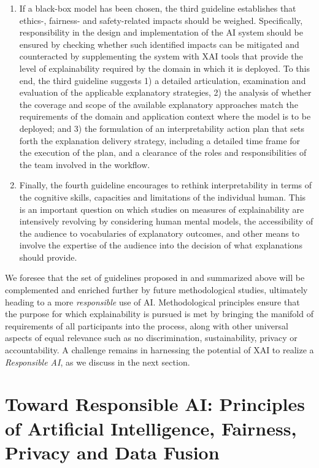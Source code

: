 \documentclass[final]{elsarticle}
\begin{document}
{\begin{enumerate}[leftmargin=*]
\item If a black-box model has been chosen, the third guideline establishes that ethics-, fairness- and safety-related impacts should be weighed. Specifically, responsibility in the design and implementation of the AI system should be ensured by checking whether such identified impacts can be mitigated and counteracted by supplementing the system with XAI tools that provide the level of explainability required by the domain in which it is deployed. To this end, the third guideline suggests 1) a detailed articulation, examination and evaluation of the applicable explanatory strategies, 2) the analysis of whether the coverage and scope of the available explanatory approaches match the requirements of the domain and application context where the model is to be deployed; and 3) the formulation of an interpretability action plan that sets forth the explanation delivery strategy, including a detailed time frame for the execution of the plan, and a clearance of the roles and responsibilities of the team involved in the workflow. 

\item Finally, the fourth guideline encourages to rethink interpretability in terms of the cognitive skills, capacities and limitations of the individual human. This is an important question on which studies on measures of explainability are intensively revolving by considering human mental models, the accessibility of the audience to vocabularies of explanatory outcomes, and other means to involve the expertise of the audience into the decision of what explanations should provide.
\end{enumerate}

We foresee that the set of guidelines proposed in \cite{1906.05684} and summarized above will be complemented and enriched further by future methodological studies, ultimately heading to a more \emph{responsible} use of AI. Methodological principles ensure that the purpose for which explainability is pursued is met by bringing the manifold of requirements of all participants into the process, along with other universal aspects of equal relevance such as no discrimination, sustainability, privacy or accountability. A challenge remains in harnessing the potential of XAI to realize a \emph{Responsible AI}, as we discuss in the next section.}

\section{Toward Responsible AI: Principles of Artificial Intelligence, Fairness, Privacy and Data Fusion} \label{sec:responsibleAI}
\end{document}
